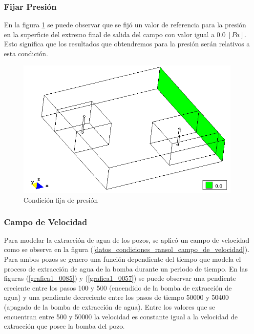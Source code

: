 \documentclass[10pt,a4paper,final]{article}
\begin{document}
\subsubsection*{Fijar Presión}
En la figura \ref{datos_condiciones_ransol_presion} se puede observar que se fijó un valor de referencia para la presión en la superficie del extremo final de salida del campo con valor igual a $0.0~\left[Pa\right]$. Esto significa que los resultados que obtendremos para la presión serán relativos a esta condición.

\begin{figure}[tbhp]
\centerline{\includegraphics[scale=0.75]{img/datos_condiciones_ransol_presion}}
\caption{Condición fija de presión}
\label{datos_condiciones_ransol_presion}
\end{figure}
\subsubsection*{Campo de Velocidad}
Para modelar la extracción de agua de los pozos, se aplicó un campo de velocidad como se observa en la figura (\ref{datos_condiciones_ransol_campo_de_velocidad}).
Para ambos pozos se genero una función dependiente del tiempo que modela el proceso de extracción de agua de la bomba durante un periodo de tiempo. En las figuras (\ref{grafica1_0085}) y (\ref{grafica1_0057}) se puede observar una pendiente creciente entre los pasos 100 y 500 (encendido de la bomba de extracción de agua) y una pendiente decreciente entre los pasos de tiempo 50000 y 50400 (apagado de la bomba de extracción de agua).
Entre los valores que se encuentran entre 500 y 50000 la velocidad es constante igual a la velocidad de extracción que posee la bomba del pozo.
\end{document}
